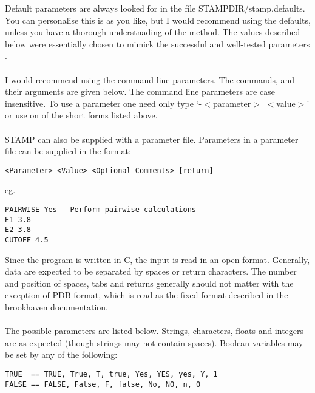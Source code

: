 Default parameters are always looked for in the file
STAMPDIR/stamp.defaults.  You can personalise this is as you like, but I 
would recommend using the defaults, unless you have a thorough 
understnading of the method. The values described below were essentially 
chosen to mimick the  successful and well-tested parameters 
\cite{rb92b}.\\
\\
I would recommend using the command line parameters.  The commands, and 
their arguments are given below.  The command line parameters are case 
insensitive.  To use a parameter one need only type `-$<$parameter$>$ $<$value$>$'
or use on of the short forms listed above.\\
\\
STAMP can also be supplied with a parameter file.  Parameters in
a parameter file can be supplied in the format:\\

\begin{scriptsize}\begin{verbatim}
<Parameter> <Value> <Optional Comments> [return]
\end{verbatim} \end{scriptsize}

eg.\\

\begin{scriptsize}\begin{verbatim}
PAIRWISE Yes   Perform pairwise calculations
E1 3.8
E2 3.8
CUTOFF 4.5
\end{verbatim} \end{scriptsize}

Since the program is written in C, the input is read in an open 
format.  Generally, data are expected to be separated by spaces or 
return characters.  The number and position of spaces, tabs and 
returns generally should not matter with the exception of PDB
format, which is read as the fixed format described in the
brookhaven documentation.\\
\\
The possible parameters are listed below.  Strings, characters,
floats and integers are as expected (though strings may not contain
spaces). Boolean variables may be set by any of the following:

\begin{scriptsize}\begin{verbatim}
TRUE  == TRUE, True, T, true, Yes, YES, yes, Y, 1
FALSE == FALSE, False, F, false, No, NO, n, 0
\end{verbatim} \end{scriptsize}

